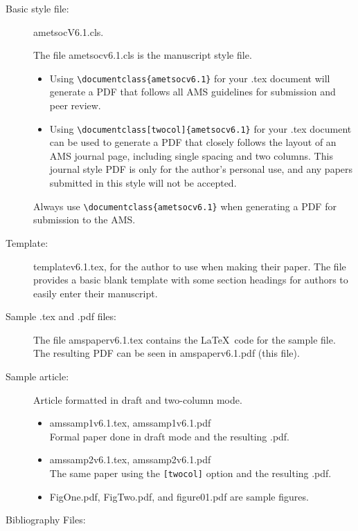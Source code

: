 \documentclass{ametsocV6.1}
\begin{document}
\begin{description}
\item[Basic style file:] ametsocV6.1.cls. 

The file ametsocv6.1.cls is the manuscript style file.  

\begin{itemize}
\item
Using \verb+\documentclass{ametsocv6.1}+ for your .tex document
will 
generate a PDF that follows all AMS guidelines for submission and peer
review.  

\item
Using \verb+\documentclass[twocol]{ametsocv6.1}+ for your .tex document
can be used to generate a PDF that closely
follows the layout of an AMS journal page, including single spacing and two
columns.  This journal style PDF is only for the author's personal use, and
any papers submitted in this style will not be accepted.  
\end{itemize}
Always use \verb+\documentclass{ametsocv6.1}+ 
when generating a PDF for submission to the AMS. 

\item[Template:]
templatev6.1.tex, for the author to use when making their
paper.
The file provides a basic blank template with some
section headings for authors to easily enter their manuscript.

\item[Sample .tex and .pdf files:]
The file amspaperv6.1.tex contains the \LaTeX\ code for the sample file.  
The resulting PDF can be seen in amspaperv6.1.pdf (this file).


\item[Sample article:] Article formatted in draft and two-column mode.

\begin{itemize}
\item
amssamp1v6.1.tex, amssamp1v6.1.pdf\\
Formal paper done in draft mode and the resulting .pdf.

\item
amssamp2v6.1.tex, amssamp2v6.1.pdf \\
The same paper using the \verb+[twocol]+ option and the resulting .pdf.

\item
FigOne.pdf, FigTwo.pdf, and figure01.pdf are sample figures.


\end{itemize}

\item[Bibliography Files:]


\end{description}
\end{document}

